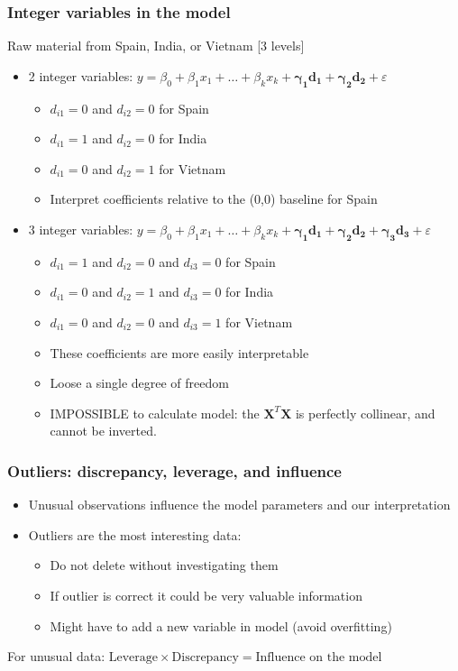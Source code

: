 \begin{frame}\frametitle{Integer variables in the model}
	
	Raw material from Spain, India, or Vietnam [3 levels]
	\begin{itemize}
		\item	2 integer variables: $y = \beta_0 + \beta_1x_1 + \ldots + \beta_k x_k +\mathbf{ \gamma_1 d_1 + \gamma_2 d_2} + \varepsilon$ 
		\begin{itemize}
			\item	$d_{i1} = 0$ and $d_{i2} = 0$ for Spain 
			\item	$d_{i1} = 1$ and $d_{i2} = 0$ for India 
			\item	$d_{i1} = 0$ and $d_{i2} = 1$ for Vietnam 
			\item	Interpret coefficients relative to the (0,0) baseline for Spain 
		\end{itemize}
	\end{itemize}
	\begin{itemize}
		\item	3 integer variables: $y = \beta_0 + \beta_1x_1 + \ldots + \beta_k x_k + \mathbf{\gamma_1 d_1 + \gamma_2 d_2 + \gamma_3 d_3} + \varepsilon$ 
		\begin{itemize}
			\item	$d_{i1} = 1$ and $d_{i2} = 0$ and $d_{i3} = 0$ for Spain 
			\item	$d_{i1} = 0$ and $d_{i2} = 1$ and $d_{i3} = 0$ for India 
			\item	$d_{i1} = 0$ and $d_{i2} = 0$ and $d_{i3} = 1$ for Vietnam 
			\item	These coefficients are more easily interpretable 
			\item	Loose a single degree of freedom 
			\item	IMPOSSIBLE to calculate model: the $\mathbf{X}^T\mathbf{X}$ is perfectly collinear, and cannot be inverted. 
		\end{itemize}
	\end{itemize}
\end{frame}

\begin{frame}\frametitle{Outliers: discrepancy, leverage, and influence}
	\begin{itemize}
		\item	Unusual observations influence the model parameters and our interpretation 
		\item	Outliers are the most interesting data: 
		\begin{itemize}
			\item	Do not delete without investigating them 
			\item	If outlier is correct it could be very valuable information 
			\item	Might have to add a new variable in model (avoid overfitting) 
		\end{itemize}
	\end{itemize}
	
	For unusual data: $\text{Leverage} \times \text{Discrepancy} = \text{Influence on the model} $
\end{frame}

